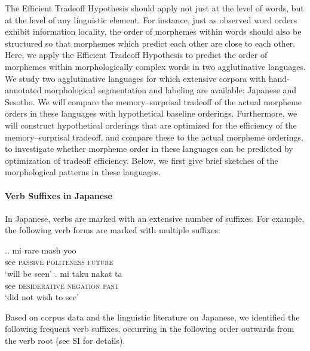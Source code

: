 
The Efficient Tradeoff Hypothesis should apply not just at the level of words, but at the level of any linguistic element.
For instance, just as observed word orders exhibit information locality, the order of morphemes within words should also be structured so that morphemes which predict each other are close to each other.
Here, we apply the Efficient Tradeoff Hypothesis to predict the order of morphemes within morphologically complex words in two agglutinative languages. We study two agglutinative languages for which extensive corpora with hand-annotated morphological segmentation and labeling are available: Japanese and Sesotho. 
We will compare the memory--surprisal tradeoff of the actual morpheme orders in these languages with hypothetical baseline orderings.
Furthermore, we will construct hypothetical orderings that are optimized for the efficiency of the memory--surprisal tradeoff, and compare these to the actual morpheme orderings, to investigate whether morpheme order in these languages can be predicted by optimization of tradeoff efficiency.
Below, we first give brief sketches of the morphological patterns in these languages. 


\paragraph{Verb Suffixes in Japanese}

In Japanese, verbs are marked with an extensive number of suffixes. For example, the following verb forms are marked with multiple suffixes:

\ex.\ag. mi  rare mash yoo \\
see  \textsc{passive}  \textsc{politeness}  \textsc{future} \\
`will be seen'
\bg. mi taku nakat ta \\
see \textsc{desiderative} \textsc{negation} \textsc{past} \\
`did not wish to see'

Based on corpus data and the linguistic literature on Japanese, we identified the following frequent verb suffixes, occurring in the following order outwards from the verb root (see SI for details).


